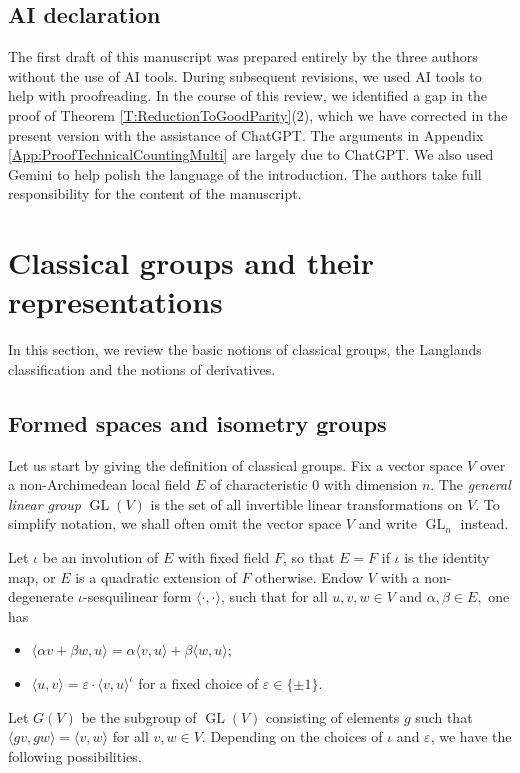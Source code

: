 \documentclass[11pt,letterpaper]{amsart}
\theoremstyle{plain}
\numberwithin{theorem}{section}
\numberwithin{equation}{subsection}
\theoremstyle{remark}
\newcommand{\GL}{\operatorname{GL}}
\begin{document}
\vskip 5pt

\subsection*{AI declaration}
The first draft of this manuscript was prepared entirely by the three authors without the use of AI tools. During subsequent revisions, we used AI tools to help with proofreading. In the course of this review, we identified a gap in the proof of Theorem \ref{T:ReductionToGoodParity}(2), which we have corrected in the present version with the assistance of ChatGPT. The arguments in Appendix \ref{App:ProofTechnicalCountingMulti} are largely due to ChatGPT. We also used Gemini to help polish the language of the introduction. The authors take full responsibility for the content of the manuscript.

\vskip 10pt


\section{Classical groups and their representations}\label{sec:classical_groups_and_their_representations}

In this section, we review the basic notions of classical groups, the Langlands classification and the notions of derivatives.

\subsection{Formed spaces and isometry groups}\label{subsec:FormedSpaceNIsomGroup}

Let us start by giving the definition of classical groups. Fix a vector space \(V\) over a non-Archimedean local field \(E\) of characteristic $0$ with dimension \(n\). The \emph{general linear group} \(\GL(V)\) is the set of all invertible linear transformations on \(V\). To simplify notation, we shall often omit the vector space \(V\) and write \(\GL_n\) instead.

\vskip 5pt

Let \(\iota\) be an involution of \(E\) with fixed field \(F\), so that \(E=F\) if \(\iota\) is the identity map, or \(E\) is a quadratic extension of \(F\) otherwise. Endow \(V\) with a non-degenerate \(\iota\)-sesquilinear form \(\langle\cdot,\cdot\rangle\), such that for all \(u,v,w\in V\) and \(\alpha,\beta\in E,\) one has
\begin{itemize}
    \item \(\langle\alpha v+\beta w,u\rangle=\alpha\langle v,u\rangle+\beta\langle w,u\rangle\);

    \vskip 5pt

    \item \(\langle u,v\rangle=\varepsilon\cdot\langle v,u\rangle^{\iota}\) for a fixed choice of \(\varepsilon\in\{\pm 1\}\).
\end{itemize}
\vskip 5pt
Let \(G(V)\) be the subgroup of \(\GL(V)\) consisting of elements \(g\) such that \(\langle gv,gw\rangle=\langle v,w\rangle\) for all \(v,w\in V\). Depending on the choices of \(\iota\) and \(\varepsilon\), we have the following possibilities.
\end{document}
